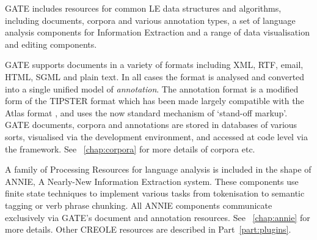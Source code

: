 
GATE includes resources for common LE data structures and algorithms,
including documents, corpora and various annotation types, a set of
language analysis components for Information Extraction and a range of data
visualisation and editing components.

GATE supports documents in a variety of formats including XML, RTF, email,
HTML, SGML and plain text. In all cases the format is analysed and converted
into a single unified model of {\em annotation}. The annotation format is
a modified form of the TIPSTER format \cite{Gri96b}
which has been made largely compatible with the Atlas format \cite{Bir99},
and uses the now standard mechanism of `stand-off markup'. GATE documents,
corpora and annotations are stored in databases of various sorts,
visualised via the
development environment, and accessed at code level via the framework.
See \Chapthing~\ref{chap:corpora} for more details of corpora etc.

A family of Processing Resources for language analysis is included in the
shape of ANNIE, A Nearly-New Information Extraction system. These components
use finite state techniques to implement various tasks from tokenisation to
semantic tagging or verb phrase chunking. All ANNIE components communicate
exclusively via GATE's document and annotation resources.
See \Chapthing~\ref{chap:annie} for more details. Other CREOLE resources are
described in Part~\ref{part:plugins}.



